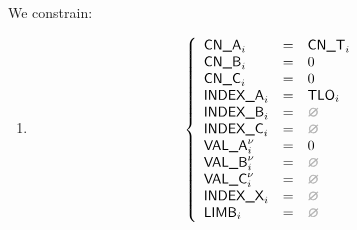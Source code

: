 \begin{center}
\end{center}

We constrain:
\begin{enumerate}
	\item 
	\[
	\left\{
	\begin{array}{lclr}
		\cnA      _{i}       & = & \cnT_{i}     \\
		\cnB      _{i}       & = & 0            \\
		\cnC      _{i}       & = & 0            \\
		\indexA   _{i}       & = & \tlo_{i}     \\
		\indexB   _{i}       & = & \nothing     \\
		\indexC   _{i}       & = & \nothing     \\
		\valA     _{i}\new{} & = & 0            \\
		\valB     _{i}\new{} & = & \nothing     \\
		\valC     _{i}\new{} & = & \nothing     \\
		\indexX   _{i}       & = & \nothing     \\
		\limb     _{i}       & = & \nothing     \\
	\end{array}
	\right.
\]
\end{enumerate}
